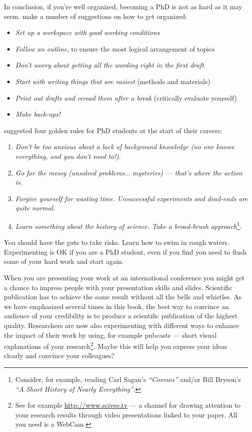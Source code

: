 \documentclass[graybox,envcountchap,sectrefs,UStrade]{svmono}
\begin{document}
In conclusion, if you're well organized, becoming a PhD is not as hard as it may seem. \citet[p.329]{Bloomfield2008} make a number of suggestions on how to get organized:

\begin{itemize}
  \item \emph{Set up a workspace with good working conditions}
  \item \emph{Follow an outline}, to ensure the most logical arrangement of topics
  \item \emph{Don't worry about getting all the wording right in the first draft}
  \item \emph{Start with writing things that are easiest} (methods and materials)
  \item \emph{Print out drafts and reread them after a break} (critically evaluate yourself)
  \item \emph{Make back-ups!}
\end{itemize}

 \citet{Weinberg2003Nature} suggested four golden rules for PhD students at the start of their careers:

\begin{enumerate}
  \item \emph{Don't be too anxious about a lack of background knowledge (no one knows everything, and you don't need to!)}.
  \item \emph{Go for the messy (unsolved problems$\ldots$ mysteries) --- that's where the action is}.
  \item \emph{Forgive yourself for wasting time. Unsuccessful experiments and dead-ends are quite normal}.
  \item \emph{Learn something about the history of science. Take a broad-brush approach}\footnote{Consider, for example, reading Carl Sagan's \emph{``Cosmos''} and/or Bill Bryson's \emph{``A Short History of Nearly Everything''}.}.
\end{enumerate}

You should have the guts to take risks. Learn how to swim in rough waters. Experimenting is OK if you are a PhD student, even if you find you need to flush some of your hard work and start again. \par

When you are presenting your work at an international conference you might get a chance to impress people with your presentation skills and slides. Scientific publication has to achieve the same result without all the bells and whistles. As we have emphasized several times in this book, the best way to convince an audience of your credibility is to produce a scientific publication of the highest quality. Researchers are now also experimenting with different ways to enhance the impact of their work by using, for example \textsf{pubcasts} --- short visual explanations of your research\footnote{See for example \url{http://www.scivee.tv} --- a channel for drawing attention to your research results through video presentations linked to your paper. All you need is a WebCam.}. Maybe this will help you express your ideas clearly and convince your colleagues?\par
\end{document}
